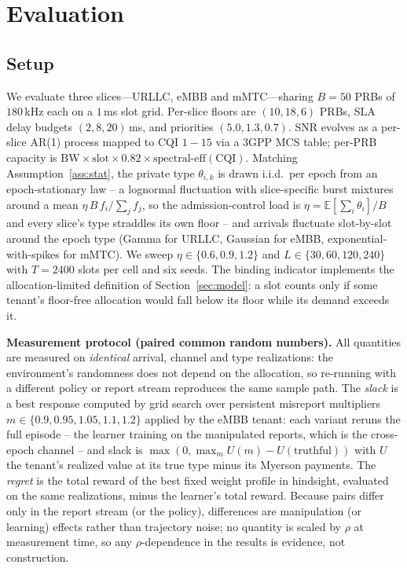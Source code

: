 \documentclass[conference]{IEEEtran}
\theoremstyle{definition}
\theoremstyle{remark}
\newcommand{\Slots}{T}
\newcommand{\Ep}{L}
\newcommand{\rhobind}{\rho}
\newcommand{\load}{\eta}
\newcommand{\type}{\theta}
\newcommand{\flo}{f}
\newcommand{\E}{\mathbb{E}}
\begin{document}
\section{Evaluation}\label{sec:eval}

\subsection{Setup}
We evaluate three slices---URLLC, eMBB and mMTC---sharing $B=50$ PRBs of $180$\,kHz each on a $1$\,ms slot grid. Per-slice floors are $(10,18,6)$ PRBs, SLA delay budgets $(2,8,20)$\,ms, and priorities $(5.0,1.3,0.7)$. SNR evolves as a per-slice AR(1) process mapped to CQI $1\!-\!15$ via a 3GPP MCS table; per-PRB capacity is $\text{BW}\times\text{slot}\times0.82\times\text{spectral-eff}(\text{CQI})$. Matching Assumption~\ref{ass:stat}, the private type $\type_{i,k}$ is drawn i.i.d.\ per epoch from an epoch-stationary law -- a lognormal fluctuation with slice-specific burst mixtures around a mean $\load\,B\,\flo_i/\sum_j \flo_j$, so the admission-control load is $\load=\E[\sum_i\type_i]/B$ and every slice's type straddles its own floor -- and arrivals fluctuate slot-by-slot around the epoch type (Gamma for URLLC, Gaussian for eMBB, exponential-with-spikes for mMTC). We sweep $\load\in\{0.6,0.9,1.2\}$ and $\Ep\in\{30,60,120,240\}$ with $\Slots=2400$ slots per cell and six seeds. The binding indicator implements the allocation-limited definition of Section~\ref{sec:model}: a slot counts only if some tenant's floor-free allocation would fall below its floor while its demand exceeds it.

\textbf{Measurement protocol (paired common random numbers).} All quantities are measured on \emph{identical} arrival, channel and type realizations: the environment's randomness does not depend on the allocation, so re-running with a different policy or report stream reproduces the same sample path. The \emph{slack} is a best response computed by grid search over persistent misreport multipliers $m\in\{0.9,0.95,1.05,1.1,1.2\}$ applied by the eMBB tenant: each variant reruns the full episode -- the learner training on the manipulated reports, which is the cross-epoch channel -- and slack is $\max(0,\max_m U(m)-U(\text{truthful}))$ with $U$ the tenant's realized value at its true type minus its Myerson payments. The \emph{regret} is the total reward of the best fixed weight profile in hindsight, evaluated on the same realizations, minus the learner's total reward. Because pairs differ only in the report stream (or the policy), differences are manipulation (or learning) effects rather than trajectory noise; no quantity is scaled by $\rhobind$ at measurement time, so any $\rhobind$-dependence in the results is evidence, not construction.
\end{document}
